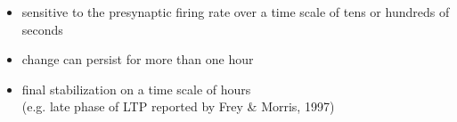 \documentclass{beamer}
\begin{document}
\begin{frame}
\begin{columns}
\end{columns}

\vspace*{3mm}

\small
{
\begin{itemize}
\item sensitive to the presynaptic firing rate over a time scale of tens or hundreds of seconds
\item change can persist for more than one hour
\item final stabilization on a time scale of hours
\\\tiny{(e.g. late phase of LTP reported by Frey \& Morris, 1997)}
\end{itemize}
}

\end{frame}
\end{document}
